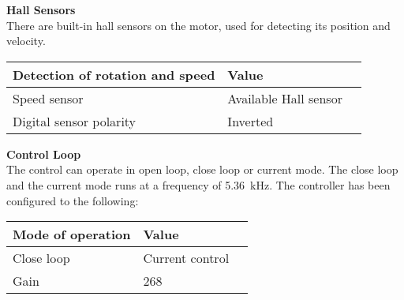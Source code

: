 \textbf{Hall Sensors}\\
There are built-in hall sensors on the motor, used for detecting its position and velocity. 
\begin{table}[H]
	\begin{tabular}{|l|l|p{4.3cm}|}
		\hline%
		\textbf{Detection of rotation and speed}       &  \textbf{Value}         \\
		\hline%
		Speed sensor                                & Available Hall sensor           \\
		\hline%
		Digital sensor polarity							  & Inverted              \\
		\hline%
	\end{tabular}
\end{table}

\textbf{Control Loop}\\
The control can operate in open loop, close loop or current mode. The close loop and the current mode runs at a frequency of \SI{5,36}{kHz}. The controller has been configured to the following:
\begin{table}[H]
	\begin{tabular}{|l|l|p{4.3cm}|}
		\hline%
		\textbf{Mode of operation}       &  \textbf{Value}         \\
		\hline%
		Close loop                                & Current control           \\
		\hline%
		Gain							  & 268              \\
		\hline%
	\end{tabular}
\end{table}


